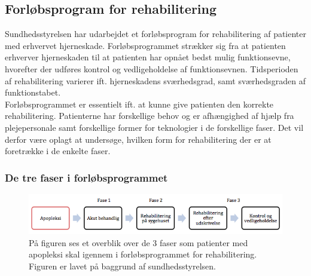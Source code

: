 \subsection{Forløbsprogram for rehabilitering} 
Sundhedsstyrelsen har udarbejdet et forløbsprogram for rehabilitering af patienter med erhvervet hjerneskade. Forløbsprogrammet strækker sig fra at patienten erhverver hjerneskaden til at patienten har opnået bedst mulig funktionsevne, hvorefter der udføres kontrol og vedligeholdelse af funktionsevnen. Tidsperioden af rehabilitering varierer ift. hjerneskadens sværhedsgrad, samt sværhedsgraden af funktionstabet. %
\cite{Sundhedsstyrelsen2011a} \\
Forløbsprogrammet er essentielt ift. at kunne give patienten den korrekte rehabilitering. Patienterne har forskellige behov og er afhængighed af hjælp fra plejepersonale samt forskellige former for teknologier i de forskellige faser. Det vil derfor være oplagt at undersøge, hvilken form for rehabilitering der er at foretrække i de enkelte faser.

\subsubsection{De tre faser i forløbsprogrammet}
\begin{figure}[H]
	\centering
	\includegraphics[scale=0.8]{figures/bProblemanalyse/flowdiagram_faser1.png}
	\caption{På figuren ses et overblik over de 3 faser som patienter med apopleksi skal igennem i forløbsprogrammet for rehabilitering. Figuren er lavet på baggrund af sundhedsstyrelsen.\cite{Sundhedsstyrelsen2011a}} 
	\label{tre_faser}
\end{figure}

